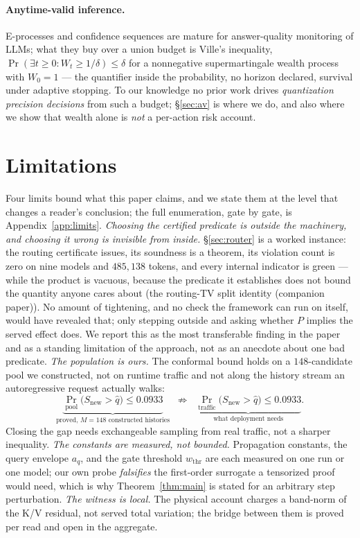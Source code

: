 \documentclass[11pt]{article}
\renewcommand{\_}{\WCorigunderscore\allowbreak}
\begin{document}
\paragraph{Anytime-valid inference.} E-processes and confidence
sequences are mature for answer-quality monitoring of LLMs; what they
buy over a union budget is Ville's inequality,
$\Pr(\exists t\ge0: W_t\ge1/\delta)\le\delta$ for a nonnegative
supermartingale wealth process with $W_0=1$ --- the quantifier inside
the probability, no horizon declared, survival under adaptive stopping.
To our knowledge no prior work drives \emph{quantization precision
decisions} from such a budget; \S\ref{sec:av} is where we do, and also
where we show that wealth alone is \emph{not} a per-action risk
account.

\section{Limitations}
\label{sec:limits}
Four limits bound what this paper claims, and we state them at the level
that changes a reader's conclusion; the full enumeration, gate by gate,
is Appendix~\ref{app:limits}.
\emph{Choosing the certified predicate is outside the machinery, and
choosing it wrong is invisible from inside.} \S\ref{sec:router} is a
worked instance: the routing certificate issues, its soundness is a
theorem, its violation count is zero on nine models and
$485{,}138$ tokens, and every internal indicator is green --- while the
product is vacuous, because the predicate it establishes does not bound
the quantity anyone cares about (the routing-TV split identity (companion paper)). No amount of
tightening, and no check the framework can run on itself, would have
revealed that; only stepping outside and asking whether $P$ implies the
served effect does. We report this as the most transferable finding in
the paper and as a standing limitation of the approach, not as an
anecdote about one bad predicate.
\emph{The population is ours.} The conformal bound holds on a
$148$-candidate pool we constructed, not on runtime traffic and not along
the history stream an autoregressive request actually walks:
\begin{equation}
\underbrace{\Pr_{\text{pool}}\bigl(S_{\text{new}}>\hat q\bigr)\le0.0933}
      _{\text{proved, }M=148\text{ constructed histories}}
\;\;\not\Longrightarrow\;\;
\underbrace{\Pr_{\text{traffic}}\bigl(S_{\text{new}}>\hat q\bigr)\le0.0933}
      _{\text{what deployment needs}} .
\label{eq:populationgap}
\end{equation}
Closing the gap needs exchangeable sampling from real traffic, not a
sharper inequality.
\emph{The constants are measured, not bounded.} Propagation constants,
the query envelope $a_q$, and the gate threshold $w_{\mathrm{thr}}$ are
each measured on one run or one model; our own probe \emph{falsifies} the
first-order surrogate a tensorized proof would need, which is why
Theorem~\ref{thm:main} is stated for an arbitrary step perturbation.
\emph{The witness is local.} The physical account charges a band-norm of
the K/V residual, not served total variation; the bridge between them is
proved per read and open in the aggregate.
\end{document}
